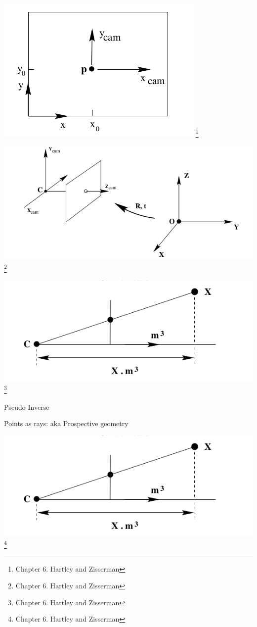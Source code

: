 \documentclass{beamer}
\begin{document}
  \begin{frame}
    \includegraphics[width=0.4\linewidth]{media/image-center.png}
    \footnote{Chapter 6. Hartley and Zisserman}
  \end{frame}

  \begin{frame}
    \includegraphics[width=0.4\linewidth]{media/world-camera-transformation.png}
    \footnote{Chapter 6. Hartley and Zisserman}
  \end{frame}

  \begin{frame}
    \includegraphics[width=0.4\linewidth]{media/recovering-ray-from-point.png}
    \footnote{Chapter 6. Hartley and Zisserman}
  \end{frame}


  \begin{frame}{Pseudo-Inverse}

  \end{frame}

  \begin{frame}{Points as rays: aka Prospective geometry}
  \end{frame}

  \begin{frame}
    \includegraphics[width=0.4\linewidth]{media/recovering-ray-from-point.png}
    \footnote{Chapter 6. Hartley and Zisserman}
  \end{frame}
\end{document}
